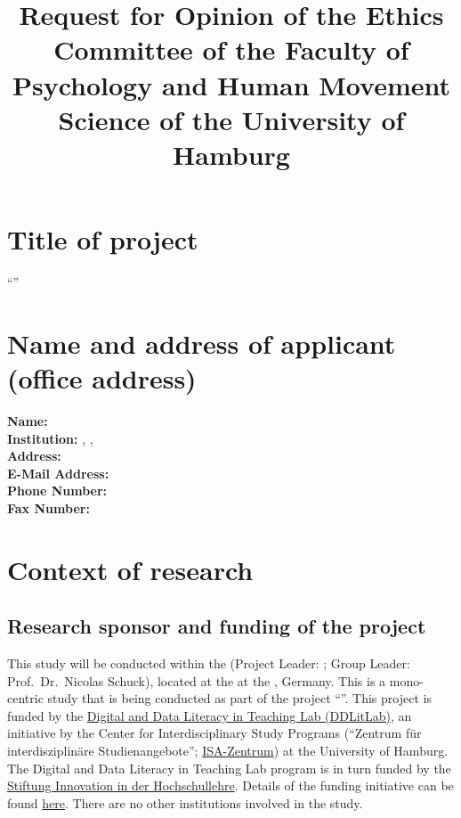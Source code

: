 \documentclass[11pt,twoside,a4paper]{article}
\title{\vspace{-1cm}Request for Opinion of the Ethics Committee of the Faculty of Psychology and Human Movement Science of the University of Hamburg\vspace{-1.5cm}}
\begin{document}
\maketitle
\thispagestyle{fancy}

\section{Title of project}

``\ProjectTitle{}''

\section{Name and address of applicant (office address)}

\textbf{Name:} \ApplicantName{}\\
\textbf{Institution:} \ApplicantUniversity{}, \ApplicantInstitute{}, \ApplicantResearchGroup{}\\
\textbf{Address:} \ApplicantAddress{}\\
\textbf{E-Mail Address:} \ApplicantEmailAddress{}\\
\textbf{Phone Number:} \ApplicantPhoneNumber{}\\
\textbf{Fax Number:} \ApplicantFaxNumber{}

\section{Context of research}


\subsection{Research sponsor and funding of the project}

This study will be conducted within the \ApplicantResearchGroup{} (Project Leader: \ApplicantName{}; Group Leader: Prof.~Dr.~Nicolas Schuck), located at the \ApplicantInstitute{} at the \ApplicantUniversity{}, Germany.
This is a mono-centric study that is being conducted as part of the project ``\ProjectTitle{}''.
This project is funded by the \href{https://www.isa.uni-hamburg.de/en/ddlitlab.html}{Digital and Data Literacy in Teaching Lab (DDLitLab)}, an initiative by the Center for Interdisciplinary Study Programs (``Zentrum für interdisziplinäre Studienangebote''; \href{https://www.isa.uni-hamburg.de/}{ISA-Zentrum}) at the University of Hamburg.
The Digital and Data Literacy in Teaching Lab program is in turn funded by the \href{https://stiftung-hochschullehre.de/en/}{Stiftung Innovation in der Hochschullehre}.
Details of the funding initiative can be found \href{https://stiftung-hochschullehre.de/projekt/ddlitlab/}{here}.
There are no other institutions involved in the study.
\end{document}
